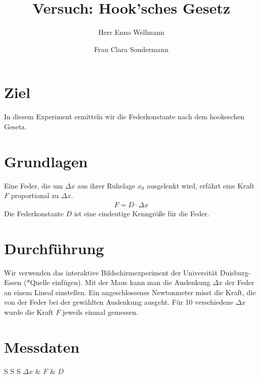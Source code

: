 

\author{Herr Enno Wellmann \and Frau Clara Sondermann} %
\title{Versuch: Hook'sches Gesetz}


\maketitle

\section[short]{Ziel}
In diesem Experiment ermitteln wir die Federkonstante nach dem hookeschen Gesetz.

\section{Grundlagen}
Eine Feder, die um $ \Delta x $ aus ihrer Ruhelage $ x_0 $ ausgelenkt wird, erfährt eine Kraft $ F $ 
proportional zu $ \Delta x $.
\begin{align}
    F = D \cdot \Delta x
\end{align}
Die Federkonstante $ D $ ist eine eindeutige Kenngröße für die Feder.

\section{Durchführung}
Wir verwenden das interaktive Bildschirmexperiment der Universität Duisburg-Essen (*Quelle einfügen).
Mit der Maus kann man die Auslenkung $ \Delta x $ der Feder an einem Lineal einstellen. 
Ein angeschlossenes Newtonmeter misst die Kraft, die von der Feder bei der gewählten Auslenkung ausgeht.
Für 10 verschiedene $ \Delta x $ wurde die Kraft $ F $ jeweils einmal gemessen.
\section{Messdaten}
\begin{table}
    \centering
    \caption{Kraft $ F $ nach $ \Delta x $ }
    \begin{tabular*}{S S S}
        \toprule
        {$ \Delta x $} & {$ F $} & {$ D $}

        
    \end{tabular*}

\end{table}
